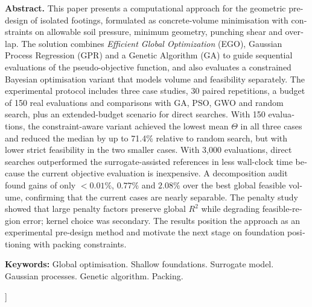 \documentclass[10pt,a4paper,twocolumn]{article}
\begin{document}
{\begin{@twocolumnfalse}
\begin{list}{}{\setlength{\leftmargin}{1.2em}\setlength{\rightmargin}{1.2em}}
\begin{otherlanguage}{english}
\noindent \textbf{Abstract.}
This paper presents a computational approach for the geometric pre-design of isolated footings, formulated as concrete-volume minimisation with constraints on allowable soil pressure, minimum geometry, punching shear and overlap. The solution combines \textit{Efficient Global Optimization} (EGO), Gaussian Process Regression (GPR) and a Genetic Algorithm (GA) to guide sequential evaluations of the pseudo-objective function, and also evaluates a constrained Bayesian optimisation variant that models volume and feasibility separately. The experimental protocol includes three case studies, 30 paired repetitions, a budget of 150 real evaluations and comparisons with GA, PSO, GWO and random search, plus an extended-budget scenario for direct searches. With 150 evaluations, the constraint-aware variant achieved the lowest mean $\Theta$ in all three cases and reduced the median by up to 71.4\% relative to random search, but with lower strict feasibility in the two smaller cases. With 3,000 evaluations, direct searches outperformed the surrogate-assisted references in less wall-clock time because the current objective evaluation is inexpensive. A decomposition audit found gains of only $<0.01\%$, $0.77\%$ and $2.08\%$ over the best global feasible volume, confirming that the current cases are nearly separable. The penalty study showed that large penalty factors preserve global $R^2$ while degrading feasible-region error; kernel choice was secondary. The results position the approach as an experimental pre-design method and motivate the next stage on foundation positioning with packing constraints.

\noindent \textbf{Keywords:} Global optimisation. Shallow foundations. Surrogate model. Gaussian processes. Genetic algorithm. Packing.
\end{otherlanguage}
\end{list}

\vspace{0.5cm}
\end{@twocolumnfalse}
}]











\balance


\end{document}

